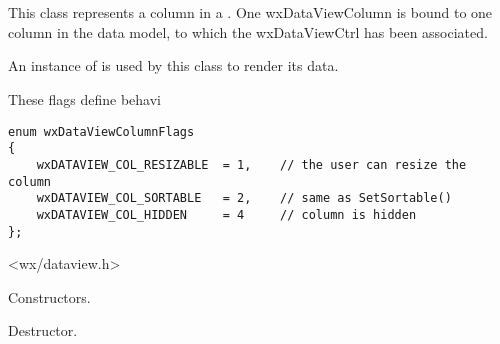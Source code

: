 
\section{}\label{wxdataviewcolumn}


This class represents a column in a .
One wxDataViewColumn is bound to one column in the data model,
to which the wxDataViewCtrl has been associated. 

An instance of  is used by
this class to render its data.


These flags define behavi

{\small
\begin{verbatim}
enum wxDataViewColumnFlags
{
    wxDATAVIEW_COL_RESIZABLE  = 1,    // the user can resize the column
    wxDATAVIEW_COL_SORTABLE   = 2,    // same as SetSortable()
    wxDATAVIEW_COL_HIDDEN     = 4     // column is hidden
};
\end{verbatim}
}




<wx/dataview.h>





\label{wxdataviewcolumnwxdataviewcolumn}




Constructors.


\label{wxdataviewcolumndtor}


Destructor.


